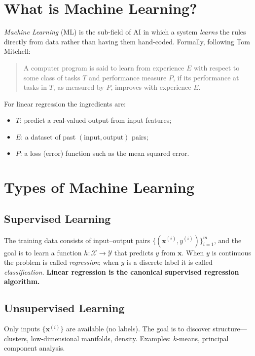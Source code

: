 \documentclass[11pt,a4paper]{report}
\theoremstyle{definition}
\theoremstyle{plain}
\theoremstyle{remark}
\newcommand{\vx}{\mathbf{x}}
\begin{document}
	\section{What is Machine Learning?}
	\emph{Machine Learning} (ML) is the sub-field of AI in which a system
	\emph{learns} the rules directly from data rather than having them
	hand-coded. Formally, following Tom Mitchell:
	
	\begin{quote}
		A computer program is said to learn from experience $E$ with respect to some
		class of tasks $T$ and performance measure $P$, if its performance at tasks in
		$T$, as measured by $P$, improves with experience $E$.
	\end{quote}
	
	For linear regression the ingredients are:
	\begin{itemize}[nosep]
		\item $T$: predict a real-valued output from input features;
		\item $E$: a dataset of past $(\text{input},\text{output})$ pairs;
		\item $P$: a loss (error) function such as the mean squared error.
	\end{itemize}
	
	\section{Types of Machine Learning}
	
	\subsection{Supervised Learning}
	The training data consists of input--output pairs
	$\{(\vx^{(i)},y^{(i)})\}_{i=1}^{m}$, and the goal is to learn a function
	$h:\mathcal{X}\to\mathcal{Y}$ that predicts $y$ from $\vx$. When $y$ is
	continuous the problem is called \emph{regression}; when $y$ is a discrete
	label it is called \emph{classification}. \textbf{Linear regression is the
		canonical supervised regression algorithm.}
	
	\subsection{Unsupervised Learning}
	Only inputs $\{\vx^{(i)}\}$ are available (no labels). The goal is to discover
	structure---clusters, low-dimensional manifolds, density. Examples: $k$-means,
	principal component analysis.
	
\end{document}
